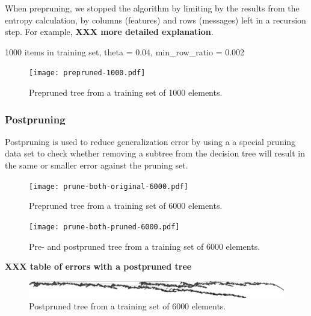 \documentclass[a4paper,10pt]{article}
\newcommand{\XXX}[1]{{\bf XXX #1}}
\begin{document}
When prepruning, we stopped the algorithm by limiting by the results
from the entropy calculation, by columns (features) and rows (messages)
left in a recursion step.  For example, \XXX{more detailed explanation}.

1000 items in training set, theta = 0.04, min\_row\_ratio = 0.002

\begin{figure}[h]
  \centering
  \begin{minipage}[c]{1.0\textwidth}
    \centering
\texttt{[image: prepruned-1000.pdf]}
  \end{minipage}
  \caption{Prepruned tree from a training set of 1000 elements.}
  \label{fig:prepruned-1000}
\end{figure}

\subsubsection{Postpruning}
\label{sect:postpruning}

Postpruning is used to reduce generalization error by using a a special
pruning data set to check whether removing a subtree from the decision
tree will result in the same or smaller error against the pruning set.

\begin{figure}[h]
  \centering
  \begin{minipage}[c]{1.0\textwidth}
    \centering

\texttt{[image: prune-both-original-6000.pdf]}
  \end{minipage}
  \caption{Prepruned tree from a training set of 6000 elements.}
  \label{fig:prune-both-original-6000}
\end{figure}

\begin{figure}[h]
  \centering
  \begin{minipage}[c]{1.0\textwidth}
    \centering

\texttt{[image: prune-both-pruned-6000.pdf]}
  \end{minipage}
  \caption{Pre- and postpruned tree from a training set of 6000 elements.}
  \label{fig:prune-both-pruned-6000}
\end{figure}

\XXX{table of errors with a postpruned tree}
\begin{figure}[h]
  \centering
  \begin{minipage}[c]{1.0\textwidth}
    \centering
\includegraphics[width=130mm]{postpruned-pruned-6000.png}
  \end{minipage}
  \caption{Postpruned tree from a training set of 6000 elements.}
  \label{fig:no-pruning-6000}
\end{figure}
\end{document}
